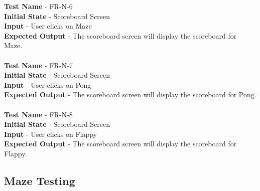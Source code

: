 \documentclass[12pt, titlepage]{article}
\begin{document}
\textbf{Test Name} - FR-N-6\\
\textbf{Initial State} - Scoreboard Screen\\
\textbf{Input} - User clicks on Maze\\
\textbf{Expected Output} - The scoreboard screen will display the scoreboard for Maze.\\ \\
\textbf{Test Name} - FR-N-7\\
\textbf{Initial State} - Scoreboard Screen\\
\textbf{Input} - User clicks on Pong\\
\textbf{Expected Output} - The scoreboard screen will display the scoreboard for Pong.\\ \\
\textbf{Test Name} - FR-N-8\\
\textbf{Initial State} - Scoreboard Screen\\
\textbf{Input} - User clicks on Flappy\\
\textbf{Expected Output} - The scoreboard screen will display the scoreboard for Flappy.\\

\subsection{Maze Testing}
\end{document}
